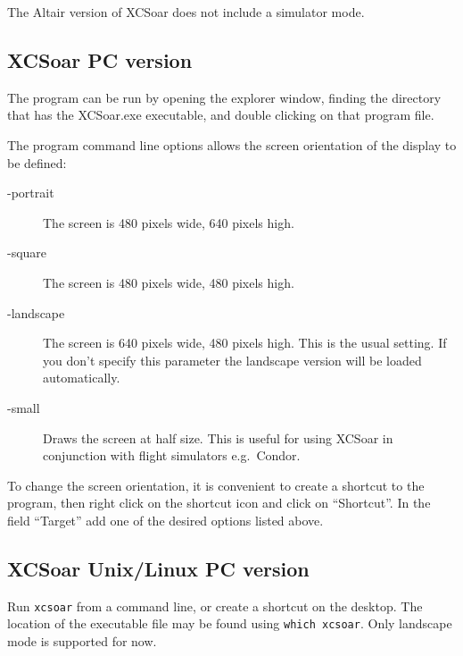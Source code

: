 The Altair version of XCSoar does not include a simulator mode.

\subsection*{XCSoar PC version}
The program can be run by opening the explorer window, finding the directory
that has the XCSoar.exe executable, and double clicking on that program file.

The program command line options allows the screen orientation of
the display to be defined:
\begin{description}
\item[-portrait] The screen is 480 pixels wide, 640 pixels high.
\item[-square] The screen is 480 pixels wide, 480 pixels high.
\item[-landscape] The screen is 640 pixels wide, 480 pixels high. This is the
usual setting. If you don't specify this parameter the landscape version will be
loaded automatically.
\item[-small] Draws the screen at half size.  This is useful for using XCSoar in
 conjunction with flight simulators e.g.\ Condor.
\end{description}
To change the screen orientation, it is convenient to create a shortcut to the
program, then right click on the shortcut icon and click on ``Shortcut''. 
In the field ``Target'' add one of the desired options listed above.

\subsection*{XCSoar Unix/Linux PC version}
Run \verb|xcsoar| from a command line, or create a shortcut on the
desktop.  The location of the executable file may be found using
\verb|which xcsoar|.  Only landscape mode is  supported for now.

